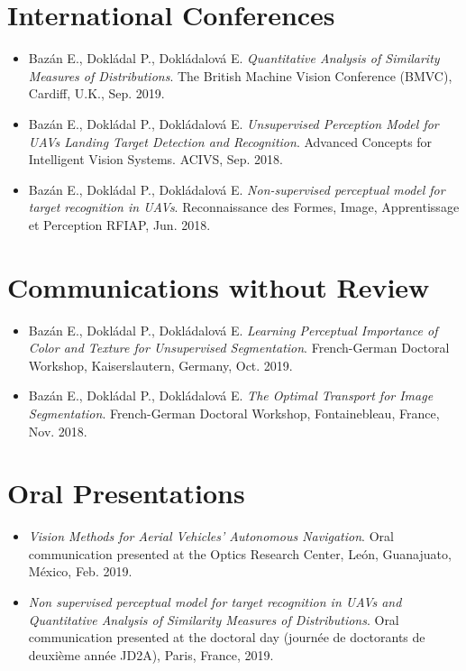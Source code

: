 \section*{International Conferences}
\begin{itemize}
    \item Bazán E., Dokládal P., Dokládalová E. \textit{Quantitative Analysis of Similarity Measures of Distributions}. The British Machine Vision Conference (BMVC), Cardiff, U.K., Sep. 2019.    
    \item Bazán E., Dokládal P., Dokládalová E. \textit{Unsupervised Perception Model for UAVs Landing Target Detection and Recognition}. Advanced Concepts for Intelligent Vision Systems. ACIVS,  Sep. 2018.   
    \item Bazán E., Dokládal P., Dokládalová E. \textit{Non-supervised perceptual model for target recognition in UAVs}. Reconnaissance des Formes, Image, Apprentissage et Perception RFIAP, Jun. 2018.
\end{itemize}

\section*{Communications without Review}%
\begin{itemize}
    \item Bazán E., Dokládal P., Dokládalová E. \textit{Learning Perceptual Importance of Color and Texture for Unsupervised Segmentation}. French-German Doctoral Workshop, Kaiserslautern, Germany, Oct. 2019.
    \item Bazán E., Dokládal P., Dokládalová E. \textit{The Optimal Transport for Image Segmentation}. French-German Doctoral Workshop, Fontainebleau, France, Nov. 2018.    
    
\end{itemize}


\section*{Oral Presentations}
\begin{itemize}    
    \item \textit{Vision Methods for Aerial Vehicles’ Autonomous Navigation}. Oral communication presented at the Optics Research Center, León, Guanajuato, México, Feb. 2019.
    \item \textit{Non supervised perceptual model for target recognition in UAVs and Quantitative Analysis of Similarity Measures of Distributions}. Oral communication presented at the doctoral day (journée de doctorants de deuxième année JD2A), Paris, France, 2019.
    
\end{itemize}


